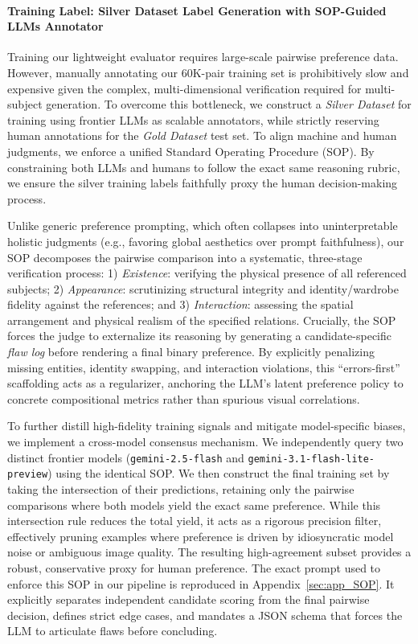 \documentclass{article}
\begin{document}
\paragraph{Training Label: Silver Dataset Label Generation with SOP-Guided LLMs Annotator}
\label{sec:method_sop_alignment}

Training our lightweight evaluator requires large-scale pairwise preference data. However, manually annotating our 60K-pair training set is prohibitively slow and expensive given the complex, multi-dimensional verification required for multi-subject generation. To overcome this bottleneck, we construct a \textit{Silver Dataset} for training using frontier LLMs as scalable annotators, while strictly reserving human annotations for the \textit{Gold Dataset} test set. To align machine and human judgments, we enforce a unified Standard Operating Procedure (SOP). By constraining both LLMs and humans to follow the exact same reasoning rubric, we ensure the silver training labels faithfully proxy the human decision-making process.

Unlike generic preference prompting, which often collapses into uninterpretable holistic judgments (e.g., favoring global aesthetics over prompt faithfulness), our SOP decomposes the pairwise comparison into a systematic, three-stage verification process: 1) \emph{Existence}: verifying the physical presence of all referenced subjects; 2) \emph{Appearance}: scrutinizing structural integrity and identity/wardrobe fidelity against the references; and 3) \emph{Interaction}: assessing the spatial arrangement and physical realism of the specified relations. Crucially, the SOP forces the judge to externalize its reasoning by generating a candidate-specific \emph{flaw log} before rendering a final binary preference. By explicitly penalizing missing entities, identity swapping, and interaction violations, this ``errors-first'' scaffolding acts as a regularizer, anchoring the LLM's latent preference policy to concrete compositional metrics rather than spurious visual correlations.

To further distill high-fidelity training signals and mitigate model-specific biases, we implement a cross-model consensus mechanism. We independently query two distinct frontier models (\texttt{gemini-2.5-flash} and \texttt{gemini-3.1-flash-lite-preview}) using the identical SOP. We then construct the final training set by taking the intersection of their predictions, retaining only the pairwise comparisons where both models yield the exact same preference. While this intersection rule reduces the total yield, it acts as a rigorous precision filter, effectively pruning examples where preference is driven by idiosyncratic model noise or ambiguous image quality. The resulting high-agreement subset provides a robust, conservative proxy for human preference. The exact prompt used to enforce this SOP in our pipeline is reproduced in Appendix~\ref{sec:app_SOP}. It explicitly separates independent candidate scoring from the final pairwise decision, defines strict edge cases, and mandates a JSON schema that forces the LLM to articulate flaws before concluding.
\end{document}
